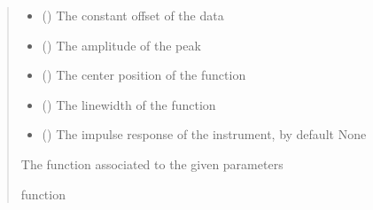 \documentclass[letterpaper,10pt,english]{sphinxmanual}
\begin{document}
\begin{fulllineitems}
\begin{fulllineitems}
\begin{quote}
\begin{description}
\begin{itemize}
\item {} 
\sphinxAtStartPar
{} () \textendash{} The constant offset of the data

\item {} 
\sphinxAtStartPar
{} () \textendash{} The amplitude of the peak

\item {} 
\sphinxAtStartPar
{} () \textendash{} The center position of the function

\item {} 
\sphinxAtStartPar
{} () \textendash{} The linewidth of the function

\item {} 
\sphinxAtStartPar
{} (\sphinxstyleliteralemphasis{\sphinxupquote{, }}) \textendash{} The impulse response of the instrument, by default None

\end{itemize}

\sphinxAtStartPar
The function associated to the given parameters

\sphinxAtStartPar
function

\end{description}\end{quote}

\end{fulllineitems}


\begin{fulllineitems}
\label{\detokenize{source/_autosummary/HDF5_BLS_treat.Models:HDF5_BLS_treat.Models.models}}
\pysigstartsignatures
\pysigline
{}
\pysigstopsignatures
\end{fulllineitems}


\end{fulllineitems}
\end{document}
